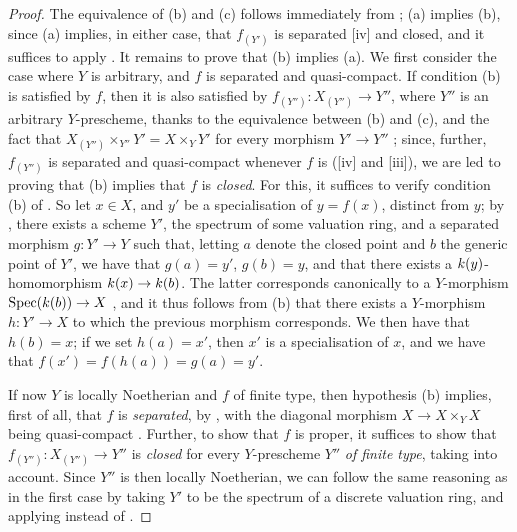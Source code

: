 \begin{proof}
The equivalence of (b) and (c) follows immediately from ;
(a) implies (b), since (a) implies, in either case, that $f_(Y')$ is separated [iv] and closed, and it suffices to apply .
It remains to prove that (b) implies (a).
We first consider the case where $Y$ is arbitrary, and $f$ is separated and quasi-compact.
If condition (b) is satisfied by $f$, then it is also satisfied by $f_{(Y'')}:X_{(Y'')}\to Y''$, where $Y''$ is an arbitrary $Y$-prescheme, thanks to the equivalence between (b) and (c), and the fact that $X_{(Y'')}\times_{Y''}Y' = X\times_Y Y'$ for every morphism $Y'\to Y''$ ;
since, further, $f_{(Y'')}$ is separated and quasi-compact whenever $f$ is ([iv] and [iii]), we are led to proving that (b) implies that $f$ is \emph{closed}.
For this, it suffices to verify condition (b) of .
So let $x\in X$, and $y'$ be a specialisation of $y=f(x)$, distinct from $y$;
by , there exists a scheme $Y'$, the spectrum of some valuation ring, and a separated morphism $g:Y'\to Y$ such that, letting $a$ denote the closed point and $b$ the generic point of $Y'$, we have that $g(a)=y'$, $g(b)=y$, and that there exists a $k(y)$-homomorphism $\kres(x)\to\kres(b)$.
The latter corresponds canonically to a $Y$-morphism $\Spec(\kres(b))\to X$ , and it thus follows from (b) that there exists a $Y$-morphism $h:Y'\to X$ to which the previous morphism corresponds.
We then have that $h(b)=x$;
if we set $h(a)=x'$, then $x'$ is a specialisation of $x$, and we have that $f(x')=f(h(a))=g(a)=y'$.

If now $Y$ is locally Noetherian and $f$ of finite type, then hypothesis (b) implies, first of all, that $f$ is \emph{separated}, by , with the diagonal morphism $X\to X\times_Y X$ being quasi-compact .
Further, to show that $f$ is proper, it suffices to show that $f_{(Y'')}:X_{(Y'')}\to Y''$ is \emph{closed} for every $Y$-prescheme $Y''$ \emph{of finite type}, taking  into account.
Since $Y''$ is then locally Noetherian, we can follow the same reasoning as in the first case by taking $Y'$ to be the spectrum of a discrete valuation ring, and applying  instead of .
\end{proof}

